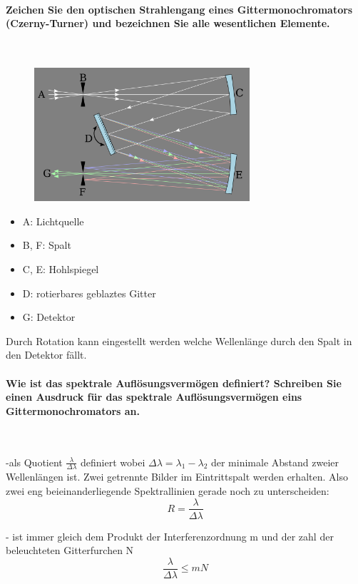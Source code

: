 \documentclass[a4paper, 11pt, ngerman, parskip=half-]{scrartcl}
\begin{document}
    \paragraph{Zeichen Sie den optischen Strahlengang eines Gittermonochromators (Czerny-Turner) und
        bezeichnen Sie alle wesentlichen Elemente.} ~

    \begin{figure}[H]
        \centering
        \includegraphics[width=8cm]{image/22/Czerny-Turner.png}
    \end{figure}
    \begin{itemize}
        \item[] A: Lichtquelle
        \item[] B, F: Spalt
        \item[] C, E: Hohlspiegel
        \item[] D: rotierbares geblaztes Gitter
        \item[] G: Detektor
    \end{itemize}
    Durch Rotation kann eingestellt werden welche Wellenlänge durch den Spalt in den Detektor fällt.
    \paragraph{Wie ist das spektrale Auflösungsvermögen definiert? Schreiben Sie einen Ausdruck für das
        spektrale Auflösungsvermögen eins Gittermonochromators an.} ~

    -als Quotient $\frac{\lambda}{\Delta \lambda}$ definiert wobei $\Delta \lambda = \lambda_1 - \lambda_2$ der minimale Abstand zweier Wellenlängen ist. Zwei getrennte Bilder im Eintrittspalt werden erhalten. Also zwei eng beieinanderliegende Spektrallinien gerade noch zu unterscheiden:
\begin{equation}
    R = \frac{\lambda}{\Delta \lambda}
\end{equation}

- ist immer gleich dem Produkt der Interferenzordnung m und der zahl der beleuchteten Gitterfurchen N
\begin{equation}
    \frac{\lambda}{\Delta \lambda} \leq mN
\end{equation}
\newpage
\end{document}
